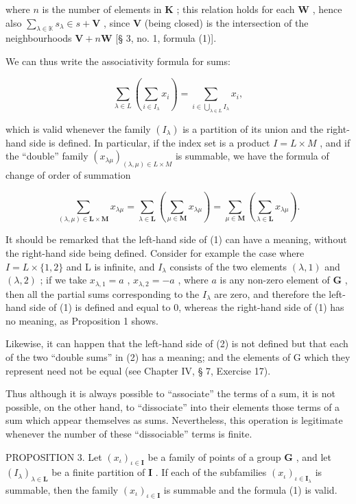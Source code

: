 where \(n\) is the number of elements in \(\mathbf{K}\) ; this relation holds for each \(\mathbf{W}\) , hence also \(\sum_{\lambda \in \mathbb{K}} s_{\lambda} \in s + \mathbf{V}\) , since \(\mathbf{V}\) (being closed) is the intersection of the neighbourhoods \(\mathbf{V} + n\mathbf{W}\) {[}§ 3, no. 1, formula (1){]}.

We can thus write the associativity formula for sums:

\[
\sum_ {\lambda \in L} (\sum_ {i \in I _ {\lambda}} x _ {i}) = \sum_ {i \in \bigcup_ {\lambda \in L} I _ {\lambda}} x _ {i},\tag{1}
\]

which is valid whenever the family \((I_{\lambda})\) is a partition of its union and the right-hand side is defined. In particular, if the index set is a product \(I = L \times M\) , and if the ``double'' family \((x_{\lambda\mu})_{(\lambda,\mu) \in L \times M}\) is summable, we have the formula of change of order of summation

\[
\sum_ {(\lambda , \mu) \in \mathbf {L} \times \mathbf {M}} x _ {\lambda \mu} = \sum_ {\lambda \in \mathbf {L}} (\sum_ {\mu \in \mathbf {M}} x _ {\lambda \mu}) = \sum_ {\mu \in \mathbf {M}} (\sum_ {\lambda \in \mathbf {L}} x _ {\lambda \mu}).\tag{2}
\]

It should be remarked that the left-hand side of (1) can have a meaning, without the right-hand side being defined. Consider for example the case where \(I = L \times \{1, 2\}\) and L is infinite, and \(I_{\lambda}\) consists of the two elements \((\lambda, 1)\) and \((\lambda, 2)\) ; if we take \(x_{\lambda,1} = a\) , \(x_{\lambda,2} = -a\) , where \(a\) is any non-zero element of \(\mathbf{G}\) , then all the partial sums corresponding to the \(I_{\lambda}\) are zero, and therefore the left-hand side of (1) is defined and equal to 0, whereas the right-hand side of (1) has no meaning, as Proposition 1 shows.

Likewise, it can happen that the left-hand side of (2) is not defined but that each of the two ``double sums'' in (2) has a meaning; and the elements of G which they represent need not be equal (see Chapter IV, § 7, Exercise 17).

Thus although it is always possible to ``associate'' the terms of a sum, it is not possible, on the other hand, to ``dissociate'' into their elements those terms of a sum which appear themselves as sums. Nevertheless, this operation is legitimate whenever the number of these ``dissociable'' terms is finite.

PROPOSITION 3. Let \((x_{\iota})_{\iota \in \mathbf{I}}\) be a family of points of a group \(\mathbf{G}\) , and let \((I_{\lambda})_{\lambda \in \mathbf{L}}\) be a finite partition of \(\mathbf{I}\) . If each of the subfamilies \((x_{\iota})_{\iota \in \mathbf{I}_{\lambda}}\) is summable, then the family \((x_{\iota})_{\iota \in \mathbf{I}}\) is summable and the formula (1) is valid.

